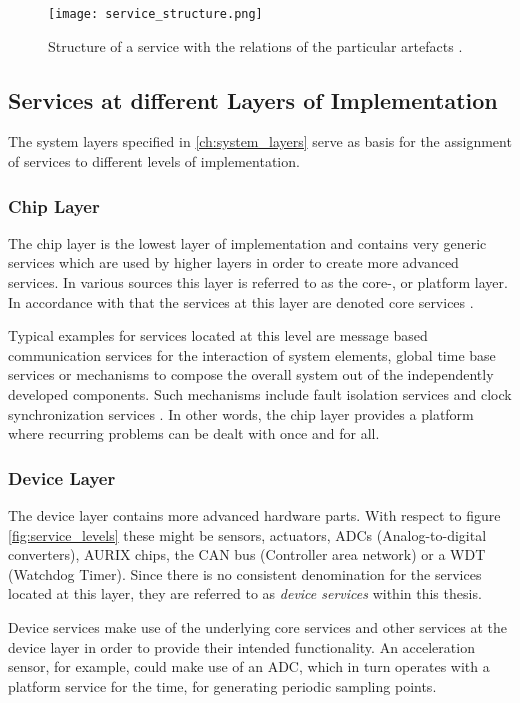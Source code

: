 \begin{figure}[!htbp]
\centering
\texttt{[image: service\_structure.png]}
\caption{Structure of a service with the relations of the particular artefacts \cite[p.45]{krafzig}.}
\label{fig:service}
\end{figure}




\subsection{Services at different Layers of Implementation}
\label{ch:service_layers}
The system layers specified in \ref{ch:system_layers} serve as basis for the assignment of services to different levels of implementation.

\subsubsection{Chip Layer}
The chip layer is the lowest layer of implementation and contains very generic services which are used by higher layers in order to create more advanced services. In various sources this layer is referred to as the core-, or platform layer. In accordance with that the services at this layer are denoted core services \cite[p.44]{genesys}.

Typical examples for services located at this level are message based 
communication services for the interaction of system elements, global time base services or mechanisms to compose the overall system out of the independently developed components. Such mechanisms include fault isolation services and clock synchronization services \cite[p.7-12]{genesys}. In other words, the chip layer provides a platform where recurring problems can be dealt with once and for all.

\subsubsection{Device Layer}
The device layer contains more advanced hardware parts. With respect to figure \ref{fig:service_levels} these might be sensors, actuators, ADCs (Analog-to-digital converters), AURIX chips, the CAN bus (Controller area network) or a WDT (Watchdog Timer). Since there is no consistent denomination for the services located at this layer, they are referred to as \emph{device services} within this thesis.

Device services make use of the underlying core services and other services at the device layer in order to provide their intended functionality. 
An acceleration sensor, for example, could make use of an ADC, which in turn operates with a platform service for the time, for generating periodic sampling points.

